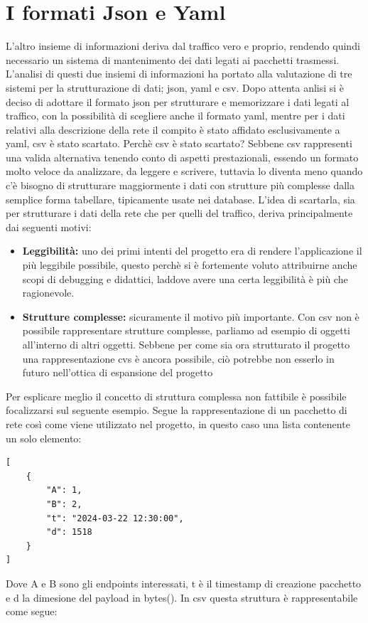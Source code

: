 \documentclass[binding=0.6cm]{sapthesis}
\begin{document}
\section{I formati Json e Yaml}
L'altro insieme di informazioni deriva dal traffico vero e proprio, rendendo quindi necessario un sistema di mantenimento dei dati legati ai pacchetti trasmessi. L'analisi di questi due insiemi di informazioni ha portato alla valutazione di tre sistemi per la strutturazione di dati; json\cite{RFC791}, yaml\cite{RFC9512} e csv\cite{RFC4180}.
Dopo attenta anlisi si è deciso di adottare il formato json per strutturare e memorizzare i dati legati al traffico, con la possibilità di scegliere anche il formato yaml, mentre per i dati relativi alla descrizione della rete il compito è stato affidato esclusivamente a yaml, csv è stato scartato.
Perchè csv è stato scartato? Sebbene csv rappresenti una valida alternativa tenendo conto di aspetti prestazionali, essendo un formato molto veloce da analizzare, da leggere e scrivere, tuttavia lo diventa meno quando c'è bisogno di strutturare maggiormente i dati con strutture più complesse dalla semplice forma tabellare, tipicamente usate nei database. 
L'idea di scartarla, sia per strutturare i dati della rete che per quelli del traffico, deriva principalmente dai seguenti motivi:

\begin{itemize}
    \item \textbf{Leggibilità:} uno dei primi intenti del progetto era di rendere l'applicazione il più leggibile possibile, questo perchè si è
    fortemente voluto attribuirne anche scopi di debugging e didattici, laddove avere una certa leggibilità è più che ragionevole.
    \item \textbf{Strutture complesse:} sicuramente il motivo più importante. Con csv non è possibile rappresentare strutture complesse, parliamo ad esempio di oggetti
    all'interno di altri oggetti. Sebbene per come sia ora strutturato il progetto una rappresentazione cvs è ancora possibile, ciò potrebbe non esserlo in futuro
    nell'ottica di espansione del progetto
\end{itemize}
Per esplicare meglio il concetto di struttura complessa non fattibile è possibile focalizzarsi
 sul seguente esempio. Segue la rappresentazione di un pacchetto di rete così come viene
 utilizzato nel progetto, in questo caso una lista contenente un solo elemento:

\begin{lstlisting}[caption={pacchetto di rete rappresentato in json}, label={fig:packet_example}]
[    
    {
        "A": 1,
        "B": 2,
        "t": "2024-03-22 12:30:00",
        "d": 1518
    }
]
\end{lstlisting}
Dove A e B sono gli endpoints interessati, t è il timestamp di creazione pacchetto e d 
la dimesione del payload in bytes(). In csv questa struttura è rappresentabile come segue:
\end{document}

